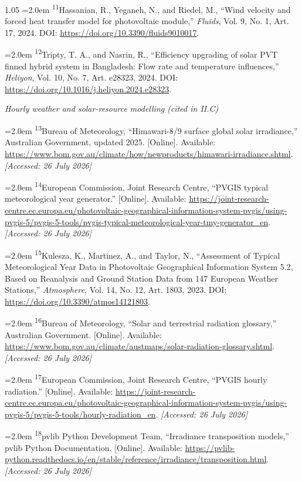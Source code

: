 \documentclass[12pt,letterpaper]{article}
\DeclareRobustCommand{\refanchor}[1]{\hypertarget{ref:#1}{#1}} %
\newcommand{\referenceheading}[1]{\vspace{1.55em}\textit{#1}\par\vspace{0.45em}}
\newcommand{\refentry}[1]{\hangindent=2.0em\hangafter=1 #1\par\vspace{0.2em}}
\begin{document}
\begin{spacing}{1.05}
\refentry{
\textsuperscript{\refanchor{11}}Hassanian, R., Yeganeh, N., and Riedel, M., ``Wind velocity and forced heat transfer model for photovoltaic module,'' \textit{Fluids}, Vol. 9, No. 1, Art. 17, 2024. DOI: \url{https://doi.org/10.3390/fluids9010017}.
}

\refentry{
\textsuperscript{\refanchor{12}}Tripty, T. A., and Nasrin, R., ``Efficiency upgrading of solar PVT finned hybrid system in Bangladesh: Flow rate and temperature influences,'' \textit{Heliyon}, Vol. 10, No. 7, Art. e28323, 2024. DOI: \url{https://doi.org/10.1016/j.heliyon.2024.e28323}.
}

\referenceheading{Hourly weather and solar-resource modelling (cited in II.C)}

\refentry{
\textsuperscript{\refanchor{13}}Bureau of Meteorology, ``Himawari-8/9 surface global solar irradiance,'' Australian Government, updated 2025. [Online]. Available: \url{https://www.bom.gov.au/climate/how/newproducts/himawari-irradiance.shtml}. \textit{[Accessed: 26 July 2026]}
}

\refentry{
\textsuperscript{\refanchor{14}}European Commission, Joint Research Centre, ``PVGIS typical meteorological year generator.'' [Online]. Available: \url{https://joint-research-centre.ec.europa.eu/photovoltaic-geographical-information-system-pvgis/using-pvgis-5/pvgis-5-tools/pvgis-typical-meteorological-year-tmy-generator_en}. \textit{[Accessed: 26 July 2026]}
}

\refentry{
\textsuperscript{\refanchor{15}}Kulesza, K., Martinez, A., and Taylor, N., ``Assessment of Typical Meteorological Year Data in Photovoltaic Geographical Information System 5.2, Based on Reanalysis and Ground Station Data from 147 European Weather Stations,'' \textit{Atmosphere}, Vol. 14, No. 12, Art. 1803, 2023. DOI: \url{https://doi.org/10.3390/atmos14121803}.
}

\refentry{
\textsuperscript{\refanchor{16}}Bureau of Meteorology, ``Solar and terrestrial radiation glossary,'' Australian Government. [Online]. Available: \url{https://www.bom.gov.au/climate/austmaps/solar-radiation-glossary.shtml}. \textit{[Accessed: 26 July 2026]}
}

\refentry{
\textsuperscript{\refanchor{17}}European Commission, Joint Research Centre, ``PVGIS hourly radiation.'' [Online]. Available: \url{https://joint-research-centre.ec.europa.eu/photovoltaic-geographical-information-system-pvgis/using-pvgis-5/pvgis-5-tools/hourly-radiation_en}. \textit{[Accessed: 26 July 2026]}
}

\refentry{
\textsuperscript{\refanchor{18}}pvlib Python Development Team, ``Irradiance transposition models,'' pvlib Python Documentation. [Online]. Available: \url{https://pvlib-python.readthedocs.io/en/stable/reference/irradiance/transposition.html}. \textit{[Accessed: 26 July 2026]}
}


\end{spacing}
\end{document}
